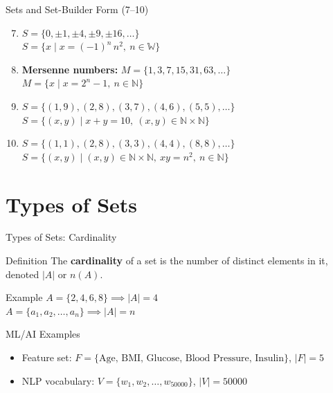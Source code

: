 \documentclass[aspectratio=169]{beamer}
\begin{document}
\begin{frame}{Sets and Set-Builder Form (7--10)}
\small
\begin{enumerate}
\setcounter{enumi}{6}
\item $S=\{0,\pm 1,\pm 4,\pm 9,\pm 16,\dots\}$ \\
$S=\{x \mid x=(-1)^n\, n^2,\ n\in \mathbb{W}\}$ 

\bigskip
\item \textbf{Mersenne numbers:} $M=\{1,3,7,15,31,63,\dots\}$ \\
$M=\{x \mid x=2^n-1,\ n\in \mathbb{N}\}$

\bigskip
\item $S=\{(1,9),(2,8),(3,7),(4,6),(5,5),\dots\}$ \\
$S=\{(x,y) \mid x+y=10,\ (x,y)\in \mathbb{N}\times\mathbb{N}\}$

\bigskip
\item $S=\{(1,1),(2,8),(3,3),(4,4),(8,8),\dots\}$ \\
$S=\{(x,y) \mid (x,y)\in \mathbb{N}\times\mathbb{N},\ xy=n^2,\ n\in \mathbb{N}\}$
\end{enumerate}
\end{frame}

\section{Types of Sets}

\begin{frame}{Types of Sets: Cardinality}
\begin{block}{Definition}
The \textbf{cardinality} of a set is the number of distinct elements in it, denoted $|A|$ or $n(A)$.
\end{block}
\begin{exampleblock}{Example}
$A=\{2,4,6,8\} \implies |A|=4$ \\
$A=\{a_1,a_2,\dots,a_n\} \implies |A|=n$
\end{exampleblock}
\begin{exampleblock}{ML/AI Examples}
\begin{itemize}
\item Feature set: $F=\{\text{Age, BMI, Glucose, Blood Pressure, Insulin}\}$, $|F|=5$
\item NLP vocabulary: $V=\{w_1,w_2,\dots,w_{50000}\}$, $|V|=50000$
\end{itemize}
\end{exampleblock}
\end{frame}
\end{document}
